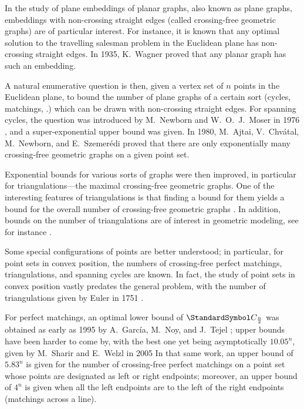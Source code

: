 In the study of plane embeddings of planar graphs, also known as plane graphs,
embeddings with non-crossing straight edges (called crossing-free geometric graphs) are of particular
interest.
For instance, it is known \cite{LeeuwenSchoone1981} that any optimal solution to the travelling salesman problem in the
Euclidean plane has non-crossing straight edges.
In 1935, K.~Wagner proved \cite{Wagner1936} that any planar graph has such an
embedding.

A natural enumerative question is then, given a vertex set of $n$ points in the Euclidean plane,
to bound the number of plane graphs of a certain sort (cycles, matchings, \etc.) which can be
drawn with non-crossing straight edges.
For spanning cycles, the question was introduced by M.~Newborn and W.~O.~J.~Moser in 1976 \cite{NewbornMoser1980},
and a super-exponential upper bound was given.
In 1980, M.~Ajtai, V.~Chvátal, M.~Newborn, and E.~Szemerédi \cite{AjtaiChvatalNewbornSzemeredi1982}
proved that there are only exponentially many crossing-free geometric graphs on a given point set.

Exponential bounds for various sorts of graphs were then improved, in particular for triangulations---the
maximal crossing-free geometric graphs. One of the interesting features of triangulations is that finding a bound for
them yields a bound for the overall number of crossing-free geometric graphs \cite{AjtaiChvatalNewbornSzemeredi1982}.
In addition, bounds on the number of triangulations
are of interest in geometric modeling, see for instance \cite{Smith1989}.

Some special configurations of points are better understood; in particular, for point sets in convex position,
the numbers of crossing-free perfect matchings, triangulations, and spanning cycles are known. In fact, the study
of point sets in convex position vastly predates the general problem, with the number of triangulations given by
Euler in 1751 \cite{Euler1751}.

For perfect matchings, an optimal lower bound of $\CatalanNumber {\frac n 2}$ was obtained as early as 1995 by A.~García,
M.~Noy, and J.~Tejel \cite{GarciaNoyTejel2000}; upper bounds have been harder to come by, with the best one
yet being asymptotically $10.05^n$, given by M.~Sharir and E.~Welzl in 2005 \cite{SharirWelzl2006}
In that same work, an upper bound of $5.83^n$ is given for the number of crossing-free perfect matchings on a
point set whose points are designated as left or right endpoints; moreover, an upper bound of $4^n$ is given
when all the left endpoints are to the left of the right endpoints (matchings across a line).

